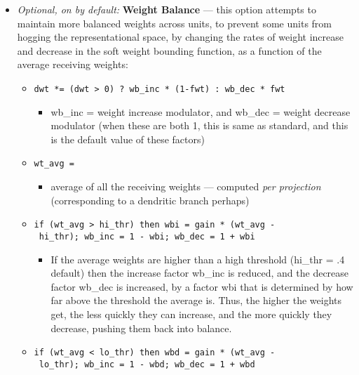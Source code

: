 \begin{itemize}
\tightlist
\item
   \emph{Optional, on by default:} \textbf{Weight Balance} --- this option attempts to
  maintain more balanced weights across units, to prevent some units
  from hogging the representational space, by changing the rates of
  weight increase and decrease in the soft weight bounding function, as
  a function of the average receiving weights:

  \begin{itemize}
  \tightlist
  \item
    \texttt{dwt\ *=\ (dwt\ \textgreater{}\ 0)\ ?\ wb\_inc\ *\ (1-fwt)\ :\ wb\_dec\ *\ fwt}

    \begin{itemize}
    \tightlist
    \item
      wb\_inc = weight increase modulator, and wb\_dec = weight decrease
      modulator (when these are both 1, this is same as standard, and
      this is the default value of these factors)
    \end{itemize}
  \item
    \texttt{wt\_avg\ =\ }

    \begin{itemize}
    \tightlist
    \item
      average of all the receiving weights --- computed \emph{per
      projection} (corresponding to a dendritic branch perhaps)
    \end{itemize}
  \item
    \texttt{if\ (wt\_avg\ \textgreater{}\ hi\_thr)\ then\ wbi\ =\ gain\ *\ (wt\_avg\ -\ hi\_thr);\ wb\_inc\ =\ 1\ -\ wbi;\ wb\_dec\ =\ 1\ +\ wbi}

    \begin{itemize}
    \tightlist
    \item
      If the average weights are higher than a high threshold (hi\_thr =
      .4 default) then the increase factor wb\_inc is reduced, and the
      decrease factor wb\_dec is increased, by a factor wbi that is
      determined by how far above the threshold the average is. Thus,
      the higher the weights get, the less quickly they can increase,
      and the more quickly they decrease, pushing them back into
      balance.
    \end{itemize}
  \item
    \texttt{if\ (wt\_avg\ \textless{}\ lo\_thr)\ then\ wbd\ =\ gain\ *\ (wt\_avg\ -\ lo\_thr);\ wb\_inc\ =\ 1\ -\ wbd;\ wb\_dec\ =\ 1\ +\ wbd}


\end{itemize}
\end{itemize}
